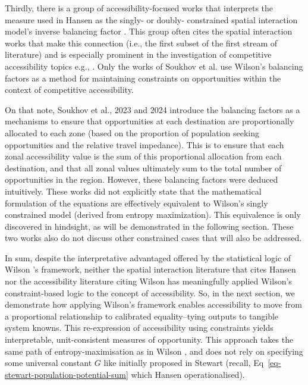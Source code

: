 \documentclass[
  10pt,
  letterpaper,
]{article}
\begin{document}
Thirdly, there is a group of accessibility-focused works that interprets
the measure used in Hansen \citep{hansen1959} as the singly- or doubly-
constrained spatial interaction model's inverse balancing factor
\citep[e.g.,][]{vickermanAccessibilityAttractionPotential1974}. This
group often cites the spatial interaction works that make this
connection (i.e., the first subset of the first stream of literature)
and is especially prominent in the investigation of competitive
accessibility topics e.g.,
\citep{karstEvaluationAccessibilityImpacts2003, geurs2006accessibility, willigers2007accessibility, el2011place, curtis2010planning, manaugh2012makes, chen2013regional, alonso2014labour, albacete2017measuring, sahebgharani2019computing, mayaud2019future, allenMeasureCompetitiveAccess2020, levinsonGeneralTheoryAccess2020, marwal2022literature, su2023untangling}.
Only the works of Soukhov et al.
\citep{soukhovIntroducingSpatialAvailability2023, soukhovMultimodalSpatialAvailability2024}
use Wilson's \citep{wilson1971} balancing factors as a method for
maintaining constraints on opportunities within the context of
competitive accessibility.

On that note, Soukhov et al., 2023 and 2024
\citep{soukhovIntroducingSpatialAvailability2023, soukhovMultimodalSpatialAvailability2024}
introduce the balancing factors as a mechanisms to ensure that
opportunities at each destination are proportionally allocated to each
zone (based on the proportion of population seeking opportunities and
the relative travel impedance). This is to ensure that each zonal
accessibility value is the sum of this proportional allocation from each
destination, and that all zonal values ultimately sum to the total
number of opportunities in the region. However, these balancing factors
were deduced intuitively. These works did not explicitly state that the
mathematical formulation of the equations are effectively equivalent to
Wilson's singly constrained model (derived from entropy maximization).
This equivalence is only discovered in hindsight, as will be
demonstrated in the following section. These two works also do not
discuss other constrained cases that will also be addressed.

In sum, despite the interpretative advantaged offered by the statistical
logic of Wilson \citep{wilson1971}'s framework, neither the spatial
interaction literature that cites Hansen \citep{hansen1959} nor the
accessibility literature citing Wilson \citep{wilson1971} has
meaningfully applied Wilson's constraint-based logic to the concept of
accessibility. So, in the next section, we demonstrate how applying
Wilson's framework enables accessibility to move from a proportional
relationship to calibrated equality--tying outputs to tangible system
knowns. This re-expression of accessibility using constraints yields
interpretable, unit-consistent measures of opportunity. This approach
takes the same path of entropy-maximisation as in Wilson
\citep{wilson1971}, and does not rely on specifying some universal
constant \(G\) like initially proposed in Stewart
\citep{stewartDemographicGravitationEvidence1948} (recall,
Eq~\ref{eq-stewart-population-potential-sum} which Hansen
\citep{hansen1959} operationalised).
\end{document}
